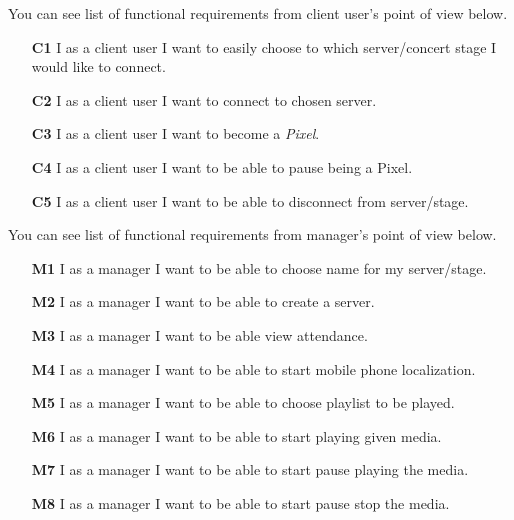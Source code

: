 You can see list of functional requirements from client user's point of view below.
\begin{enumerate}
	\item[\textbf{C1}] \label{req_C1}
		I as a client user I want to easily choose to which server/concert stage I would like to connect.
		
	\item[\textbf{C2}] \label{req_C2}
		I as a client user I want to connect to chosen server.
		
	\item[\textbf{C3}] \label{req_C3}
		I as a client user I want to become a \emph{Pixel}.
	
	\item[\textbf{C4}] \label{req_C4}
		I as a client user I want to be able to pause being a Pixel.
		
	\item[\textbf{C5}] \label{req_C5}
		I as a client user I want to be able to disconnect from server/stage.
\end{enumerate}


You can see list of functional requirements from manager's point of view below.
\begin{enumerate}
	\item[\textbf{M1}] \label{req_M1}
		I as a manager I want to be able to choose name for my server/stage.
		
	\item[\textbf{M2}] \label{req_M2}
		I as a manager I want to be able to create a server.
		
	\item[\textbf{M3}] \label{req_M3}
		I as a manager I want to be able view attendance.
	
	\item[\textbf{M4}] \label{req_M4}
		I as a manager I want to be able to start mobile phone localization.
		
	\item[\textbf{M5}] \label{req_M5}
		I as a manager I want to be able to choose playlist to be played.
		
	\item[\textbf{M6}] \label{req_M6}
		I as a manager I want to be able to start playing given media.
		
	\item[\textbf{M7}] \label{req_M7}
		I as a manager I want to be able to start pause playing the media.
	\item[\textbf{M8}] \label{req_M8}
		I as a manager I want to be able to start pause stop the media.
\end{enumerate}

